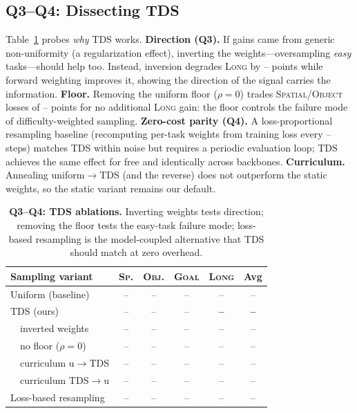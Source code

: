 \documentclass[letterpaper]{article} %
\newcommand{\tds}{TDS}    %
\newcommand{\na}{--}      %
\begin{document}
\subsection{Q3--Q4: Dissecting \tds{}}
Table~\ref{tab:tds_ablation} probes \emph{why} \tds{} works.
\textbf{Direction (Q3).} If gains came from generic non-uniformity (a regularization effect), inverting the weights---oversampling \emph{easy} tasks---should help too. Instead, inversion degrades \textsc{Long} by \na{} points while forward weighting improves it,
showing the direction of the signal carries the information.
\textbf{Floor.} Removing the uniform floor ($\rho = 0$) trades \textsc{Spatial}/\textsc{Object} losses of \na{} points for no additional \textsc{Long} gain: the floor controls the failure mode of difficulty-weighted sampling.
\textbf{Zero-cost parity (Q4).} A loss-proportional resampling baseline (recomputing per-task weights from training loss every \na{} steps) matches \tds{} within noise but requires a periodic evaluation loop; \tds{} achieves the same effect for free and identically across backbones.
\textbf{Curriculum.} Annealing uniform$\rightarrow$\tds{} (and the reverse) does not outperform the static weights, so the static variant remains our default.

\begin{table}[t]
\centering
\setlength{\tabcolsep}{1mm}
\begin{tabular}{lccccc}
\toprule
Sampling variant & \textsc{Sp.} & \textsc{Obj.} & \textsc{Goal} & \textsc{Long} & Avg \\
\midrule
Uniform (baseline)        & \na{} & \na{} & \na{} & \na{} & \na{} \\
\tds{} (ours)             & \na{} & \na{} & \na{} & \textbf{\na{}} & \textbf{\na{}} \\
\midrule
\ \ inverted weights      & \na{} & \na{} & \na{} & \na{} & \na{} \\
\ \ no floor ($\rho{=}0$) & \na{} & \na{} & \na{} & \na{} & \na{} \\
\ \ curriculum u$\rightarrow$\tds{} & \na{} & \na{} & \na{} & \na{} & \na{} \\
\ \ curriculum \tds{}$\rightarrow$u & \na{} & \na{} & \na{} & \na{} & \na{} \\
\midrule
Loss-based resampling     & \na{} & \na{} & \na{} & \na{} & \na{} \\
\bottomrule
\end{tabular}
\caption{\textbf{Q3--Q4: \tds{} ablations.} Inverting weights tests direction; removing the floor tests the easy-task failure mode; loss-based resampling is the model-coupled alternative that \tds{} should match at zero overhead. %
}
\label{tab:tds_ablation}
\end{table}
\end{document}
